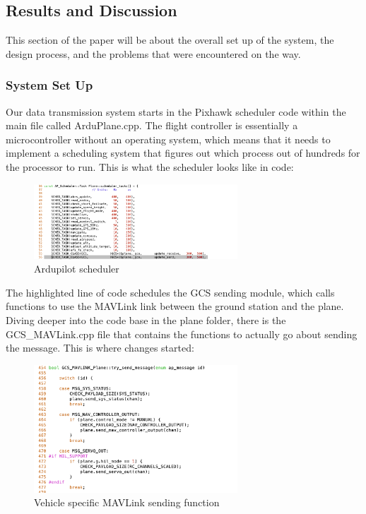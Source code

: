\documentclass[12pt,journal,compsoc]{IEEEtran}
\begin{document}
\subsection{Results and Discussion}
This section of the paper will be about the overall set up of the system, the design process, and the problems that were encountered on the way.
\subsubsection{System Set Up}
Our data transmission system starts in the Pixhawk scheduler code within the main file called ArduPlane.cpp. The flight controller is essentially a microcontroller without an operating system, which means that it needs to implement a scheduling system that figures out which process out of hundreds for the processor to run. This is what the scheduler looks like in code:
\begin{figure}[h!]
\hspace*{0cm}
\centering
\includegraphics[width=3in]{Scheduler.png}
\caption{Ardupilot scheduler}
\label{mavSched}
\end{figure}

The highlighted line of code schedules the GCS sending module, which calls functions to use the MAVLink link between the ground station and the plane. Diving deeper into the code base in the plane folder, there is the GCS\_MAVLink.cpp file that contains the functions to actually go about sending the message. This is where changes started:
\begin{figure}[h!]
\hspace*{0cm}
\centering
\includegraphics[width=3in]{GCS_Mavlink.png}
\caption{Vehicle specific MAVLink sending function}
\label{gcsMav}
\end{figure}
\end{document}
